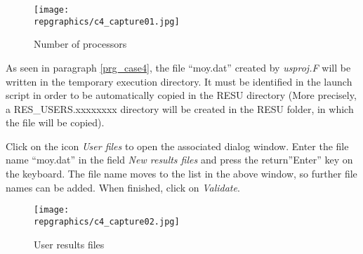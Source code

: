 \begin{figure}[h!]
\begin{center}
\texttt{[image: \\repgraphics/c4\_capture01.jpg]} 
\caption{Number of processors}
\label{fig1_e4}
\end{center}
\end{figure}


\newpage
As seen in paragraph \ref{prg_case4}, the file ``moy.dat'' created by
{\itshape usproj.F} will be written in the temporary execution directory. It
must be identified in the launch script in order to be automatically copied in
the RESU directory (More precisely, a RES\_USERS.xxxxxxxx directory will be
created in the RESU folder, in which the file will be copied).

Click on the icon {\itshape User files} to open the associated dialog window.
Enter the file name ``moy.dat'' in the field {\itshape New results files}  
and press the return''Enter'' key on the keyboard. The file name moves to the
list in the above window, so further file names can be added. When finished,
click on {\itshape Validate}. 

\begin{figure}[h!]
\begin{center}
\texttt{[image: \\repgraphics/c4\_capture02.jpg]} 
\caption{User results files}
\label{fig2_e4}
\end{center}
\end{figure}


